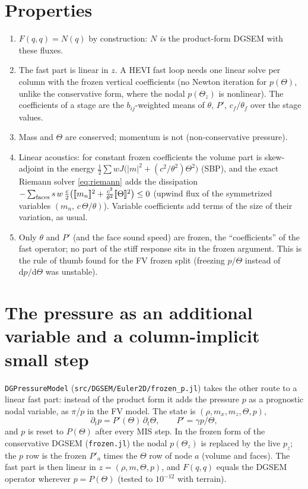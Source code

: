 \documentclass[11pt,a4paper]{article}
\newcommand{\jump}[1]{[\![#1]\!]}
\newcommand{\code}[1]{\texttt{#1}}
\begin{document}
\section{Properties}
\begin{enumerate}
\item $F(q,q)=N(q)$ by construction: $N$ \emph{is} the product-form DGSEM with these fluxes.
\item The fast part is linear in $z$. A HEVI fast loop needs one linear solve per column with the frozen
  vertical coefficients (no Newton iteration for $p(\Theta)$, unlike the conservative form, where the
  nodal $p(\Theta_z)$ is nonlinear). The coefficients of a stage are the $b_{ij}$-weighted means of
  $\theta$, $P'$, $c_f/\theta_f$ over the stage values.
\item Mass and $\Theta$ are conserved; momentum is not (non-conservative pressure).
\item Linear acoustics: for constant frozen coefficients the volume part is skew-adjoint in the energy
  $\tfrac12\sum w J\big(|m|^2+(c^2/\theta^2)\Theta^2\big)$ (SBP), and the exact Riemann solver
  \eqref{eq:riemann} adds the dissipation
  $-\sum_{\rm faces} s\,w\,\tfrac{c}{2}\big(\jump{m_n}^2+\tfrac{c^2}{\theta^2}\jump\Theta^2\big)\le0$
  (upwind flux of the symmetrized variables $(m_n,\,c\,\Theta/\theta)$).
  Variable coefficients add terms of the size of their variation, as usual.
\item Only $\theta$ and $P'$ (and the face sound speed) are frozen, the ``coefficients'' of the
  fast operator; no part of the stiff response sits in the frozen argument. This is the rule of thumb
  found for the FV frozen split (freezing $p/\Theta$ instead of $\mathrm dp/\mathrm d\Theta$ was unstable).
\end{enumerate}

\section{The pressure as an additional variable and a column-implicit small step}\label{sec:pdg}
\code{DGPressureModel} (\code{src/DGSEM/Euler2D/frozen\_p.jl}) takes the other route to a linear fast part:
instead of the product form it adds the pressure $p$ as a prognostic nodal variable, as $\pi$/$p$ in the FV
model. The state is $(\rho,m_x,m_z,\Theta,p)$,
\[
\partial_tp=P'(\Theta)\,\partial_t\Theta,\qquad P'=\gamma p/\Theta,
\]
and $p$ is reset to $P(\Theta)$ after every MIS step. In the frozen form of the conservative DGSEM
(\code{frozen.jl}) the nodal $p(\Theta_z)$ is replaced by the live $p_z$; the $p$ row is the frozen $P'_a$
times the $\Theta$ row of node $a$ (volume and faces). The fast part is then linear in $z=(\rho,m,\Theta,p)$, and
$F(q,q)$ equals the DGSEM operator wherever $p=P(\Theta)$ (tested to $10^{-12}$ with terrain).
\end{document}
